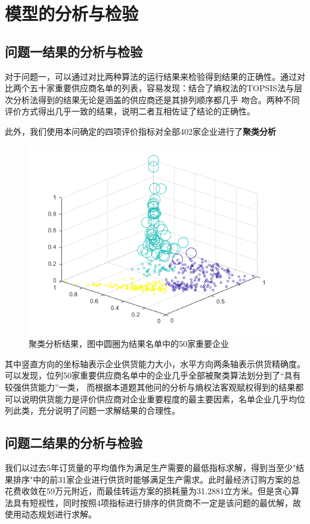 \documentclass[withoutpreface,bwprint]{cumcmthesis}
\begin{document}
\section{模型的分析与检验}
\subsection{问题一结果的分析与检验}
对于问题一，可以通过对比两种算法的运行结果来检验得到结果的正确性。通过对比两个五十家重要供应商名单的列表，容易发现：结合了熵权法的TOPSIS法与层次分析法得到的结果无论是涵盖的供应商还是其排列顺序都几乎
吻合。两种不同评价方式得出几乎一致的结果，说明二者互相佐证了结论的正确性。\par
此外，我们使用本问确定的四项评价指标对全部402家企业进行了\textbf{聚类分析}
\begin{figure}[H]
    \centering
    \includegraphics[scale = 0.7]{julei.png}
    \centering
    \caption{聚类分析结果，图中圆圈为结果名单中的50家重要企业} \label{fig:5}
\end{figure}
其中竖直方向的坐标轴表示企业供货能力大小，水平方向两条轴表示供货精确度。可以发现，位列50家重要供应商名单中的企业几乎全部被聚类算法划分到了“具有较强供货能力”一类，
而根据本道题其他问的分析与熵权法客观赋权得到的结果都可以说明供货能力是评价供应商对企业重要程度的最主要因素，名单企业几乎均位列此类，充分说明了问题一求解结果的合理性。
\subsection{问题二结果的分析与检验}
我们以过去5年订货量的平均值作为满足生产需要的最低指标求解，得到当至少"结果排序"中的前31家企业进行供货时能够满足生产需求。此时最经济订购方案的总花费收敛在59万元附近，而最佳转运方案的损耗量为31.2881立方米。但是贪心算法具有短视性，同时按照4项指标进行排序的供货商不一定是该问题的最优解，故使用动态规划进行求解。\\
\end{document}
